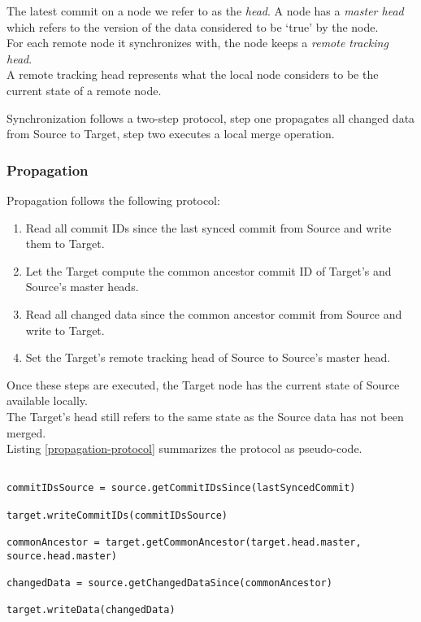 The latest commit on a node we refer to as the \emph{head}.
A node has a \emph{master head} which refers to the version of the data considered to be `true' by the node.\\
For each remote node it synchronizes with, the node keeps a \emph{remote tracking head}.\\
A remote tracking head represents what the local node considers to be the current state of a remote node.

Synchronization follows a two-step protocol, step one propagates all changed data from Source to Target, step two executes a local merge operation.

\subsubsection{Propagation}
Propagation follows the following protocol:

\begin{enumerate}
\item Read all commit IDs since the last synced commit from Source and write them to Target.
\item Let the Target compute the common ancestor commit ID of Target's and Source's master heads.
\item Read all changed data since the common ancestor commit from Source and write to Target.
\item Set the Target's remote tracking head of Source to Source's master head.
\end{enumerate}

Once these steps are executed, the Target node has the current state of Source available locally.\\
The Target's head still refers to the same state as the Source data has not been merged.\\

Listing \ref{propagation-protocol} summarizes the protocol as pseudo-code.

\begin{lstlisting}[caption=Propagation Protocol, label=propagation-protocol]

commitIDsSource = source.getCommitIDsSince(lastSyncedCommit)

target.writeCommitIDs(commitIDsSource)

commonAncestor = target.getCommonAncestor(target.head.master, source.head.master)

changedData = source.getChangedDataSince(commonAncestor)

target.writeData(changedData)

\end{lstlisting}

